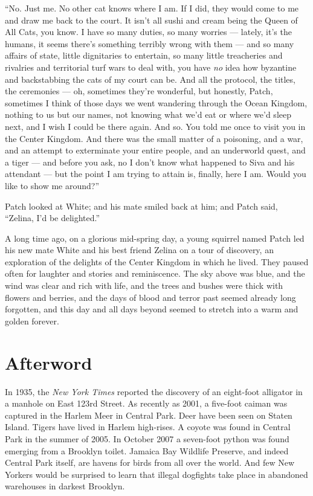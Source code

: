 \documentclass[12pt]{memoir}
\begin{document}
“No. Just me. No other cat knows where I am. If I did, they would come
to me and draw me back to the court. It isn’t all sushi and cream
being the Queen of All Cats, you know. I have so many duties, so many
worries — lately, it’s the humans, it seems there’s something terribly
wrong with them — and so many affairs of state, little dignitaries to
entertain, so many little treacheries and rivalries and territorial
turf wars to deal with, you have \textit{no} idea how byzantine and
backstabbing the cats of my court can be. And all the protocol, the
titles, the ceremonies — oh, sometimes they’re wonderful, but
honestly, Patch, sometimes I think of those days we went wandering
through the Ocean Kingdom, nothing to us but our names, not knowing
what we’d eat or where we’d sleep next, and I wish I could be there
again. And so. You told me once to visit you in the Center
Kingdom. And there was the small matter of a poisoning, and a war, and
an attempt to exterminate your entire people, and an underworld quest,
and a tiger — and before you ask, no I don’t know what happened to
Siva and his attendant — but the point I am trying to attain is,
finally, here I am. Would you like to show me around?”

Patch looked at White; and his mate smiled back at him; and Patch
said, “Zelina, I’d be delighted.”

A long time ago, on a glorious mid-spring day, a young squirrel named
Patch led his new mate White and his best friend Zelina on a tour of
discovery, an exploration of the delights of the Center Kingdom in
which he lived. They paused often for laughter and stories and
reminiscence. The sky above was blue, and the wind was clear and rich
with life, and the trees and bushes were thick with flowers and
berries, and the days of blood and terror past seemed already long
forgotten, and this day and all days beyond seemed to stretch into a
warm and golden forever.


\section{Afterword}

In 1935, the \textit{New York Times} reported the discovery of an
eight-foot alligator in a manhole on East 123rd Street. As recently as
2001, a five-foot caiman was captured in the Harlem Meer in Central
Park. Deer have been seen on Staten Island. Tigers have lived in
Harlem high-rises. A coyote was found in Central Park in the summer of
2005. In October 2007 a seven-foot python was found emerging from a
Brooklyn toilet. Jamaica Bay Wildlife Preserve, and indeed Central
Park itself, are havens for birds from all over the world. And few New
Yorkers would be surprised to learn that illegal dogfights take place
in abandoned warehouses in darkest Brooklyn.
\end{document}
